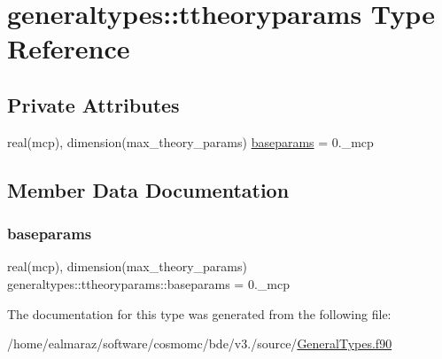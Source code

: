\hypertarget{structgeneraltypes_1_1ttheoryparams}{}\section{generaltypes\+:\+:ttheoryparams Type Reference}
\label{structgeneraltypes_1_1ttheoryparams}
\subsection*{Private Attributes}
\begin{DoxyCompactItemize}
\item 
real(mcp), dimension(max\+\_\+theory\+\_\+params) \mbox{\hyperlink{structgeneraltypes_1_1ttheoryparams_acf58fabf16ed6b7f323d43b71e146015}{baseparams}} = 0.\+\_\+mcp
\end{DoxyCompactItemize}


\subsection{Member Data Documentation}
\mbox{\label{structgeneraltypes_1_1ttheoryparams_acf58fabf16ed6b7f323d43b71e146015}} 
\subsubsection{\texorpdfstring{baseparams}{baseparams}}
{\footnotesize\ttfamily real(mcp), dimension(max\+\_\+theory\+\_\+params) generaltypes\+::ttheoryparams\+::baseparams = 0.\+\_\+mcp\hspace{0.3cm}{\ttfamily [private]}}



The documentation for this type was generated from the following file\+:\begin{DoxyCompactItemize}
\item 
/home/ealmaraz/software/cosmomc/bde/v3./source/\mbox{\hyperlink{GeneralTypes_8f90}{General\+Types.\+f90}}\end{DoxyCompactItemize}
